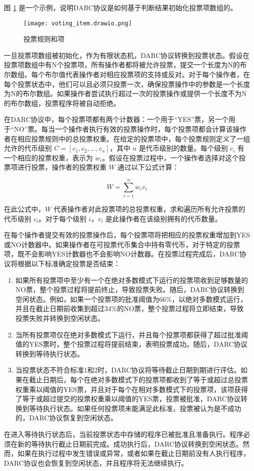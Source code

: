 \documentclass[main.tex]{subfiles}
\begin{document}
图 \ref{fig:voting_item} 是一个示例，说明DARC协议是如何基于判断结果初始化投票项数组的。

\begin{figure}
\centering
\texttt{[image: voting\_item.drawio.png]}
\caption{\label{fig:voting_item}投票规则和项}
\end{figure}


一旦投票项数组被初始化，作为有限状态机，DARC协议转换到投票状态。假设在投票项数组中有N个投票项，所有操作者都将被允许投票，提交一个长度为N的布尔数组。每个布尔值代表操作者对相应投票项的支持或反对。对于每个操作者，在每个投票状态中，他们可以且必须只投票一次，确保投票操作中的参数是一个长度为N的布尔数组。如果操作者尝试执行超过一次的投票操作或提供一个长度不为N的布尔数组，投票程序将被自动拒绝。

在DARC协议中，每个投票项都有两个计数器：一个用于“YES”票，另一个用于“NO”票。每当一个操作者执行有效的投票操作时，每个投票项都会计算该操作者在相应投票规则中的总投票权重。在给定的投票项中，每个投票规则定义了一组允许的代币级别 \(C = [c_1, c_2, ..., c_n]\)，其中 \(n\) 是代币级别的数量。每个级别 \(c_i\) 有一个相应的投票权重，表示为 \(w_i\)。假设在投票过程中，一个操作者选择对这个投票项进行投票，操作者的投票权重 \(W\) 通过以下公式计算：

\[
W = \sum_{i=1}^{n} w_i v_i
\]

在此公式中，\(W\) 代表操作者对此投票项的总投票权重，求和遍历所有允许投票的代币级别 \(c_i\)。对于每个级别 \(i\)，\(v_i\) 是此操作者在该级别拥有的代币数量。

在每个操作者提交有效的投票操作后，每个投票项将把相应的投票权重增加到YES或NO计数器中。如果操作者在可投票代币集合中持有零代币，对于特定的投票项，既不会影响YES计数器也不会影响NO计数器。在投票过程完成后，DARC协议将根据以下标准确定投票是否结束：

\begin{enumerate}

    \item 如果所有投票项中至少有一个在绝对多数模式下运行的投票项收到足够数量的NO票，整个投票过程将提前终止，导致投票失败。随后，DARC协议转换到空闲状态。例如，如果一个投票项的批准阈值为66\%，以绝对多数模式运行，并且在截止日期前收集到超过34\%的NO票，整个投票过程将立即结束，导致投票失败并转换到空闲状态。

    \item 当所有投票项仅在绝对多数模式下运行，并且每个投票项都获得了超过批准阈值的YES票时，整个投票过程将提前结束，表明投票成功。随后，DARC协议转换到等待执行状态。
    
    \item 当投票状态不符合标准1和2时，DARC协议将等待截止日期到期进行评估。如果在截止日期后，每个在绝对多数模式下的投票项都收到了等于或超过总投票权重乘以阈值的YES票，并且对于每个在相对多数模式下的投票项，该项获得了等于或超过提交的投票权重乘以阈值的YES票，投票被批准，DARC协议转换到等待执行状态。如果任何投票项未能满足此标准，投票被认为是不成功的，DARC协议恢复到空闲状态。
\end{enumerate}

在进入等待执行状态后，当前投票状态中存储的程序已被批准且准备执行。程序必须在新的等待执行截止日期前完成。成功执行后，DARC协议转换到空闲状态。然而，如果在执行过程中发生错误或异常，或者如果在截止日期前没有人执行程序，DARC协议也会恢复到空闲状态，并且程序将无法继续执行。
\end{document}
